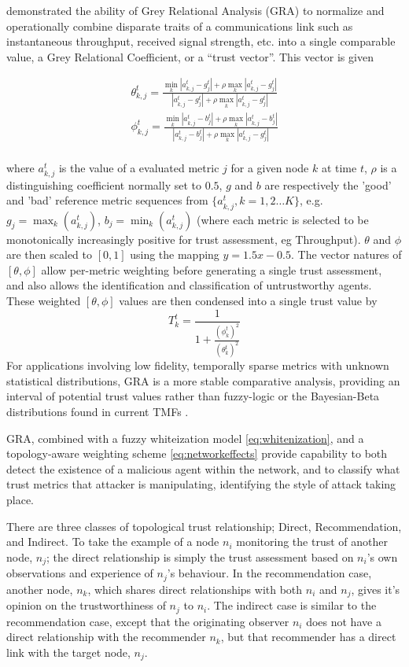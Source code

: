 \documentclass[runningheads,a4paper]{llncs}
\begin{document}
\cite{Guo2012} demonstrated the ability of Grey Relational Analysis (GRA) to normalize and operationally combine disparate traits of a communications link such as instantaneous throughput, received signal strength, etc. into a single comparable value, a Grey Relational Coefficient, or a ``trust vector''.
This vector is given

\begin{align}
  \label{eq:grc}
  \theta_{k,j}^t = \frac{\min_k|a_{k,j}^t - g_j^t| + \rho \max_k|a_{k,j}^t-g_j^t|}{|a_{k,j}^t-g_j^t| + \rho \max_k|a_{k,j}^t-g_j^t|} \\
  \phi_{k,j}^t = \frac{\min_k|a_{k,j}^t - b_j^t| + \rho \max_k|a_{k,j}^t-b_j^t|}{|a_{k,j}^t-b_j^t| + \rho \max_k|a_{k,j}^t-g_j^t|}\\
\end{align}

where $a_{k,j}^t$ is the value of a evaluated metric $j$ for a given node $k$ at time $t$, $\rho$ is a distinguishing coefficient normally set to $0.5$, $g$ and $b$ are respectively the 'good' and 'bad' reference metric sequences from $\{a_{k,j}^t, k=1,2\dots K\}$, e.g. $g_j=\max_k({a_{k,j}^t})$,  $b_j=\min_k({a_{k,j}^t})$ (where each metric is selected to be monotonically increasingly positive for trust assessment, eg Throughput). $\theta$ and $\phi$ are then scaled to $[0,1]$ using the mapping $y = 1.5 x - 0.5$.
The vector natures of $[\theta,\phi]$ allow per-metric weighting before generating a single trust assessment, and also allows the identification and classification of untrustworthy agents.
These weighted $[\theta,\phi]$ values are then condensed into a single trust value by
\begin{equation}
  \label{eq:trustvalue}
  T_k^t = \frac{1}{1+\frac{(\phi_k^t)^2}{(\theta_k^t)^2}}
\end{equation}
For applications involving low fidelity, temporally sparse metrics with unknown statistical distributions, GRA is a more stable comparative analysis, providing an interval of potential trust values rather than fuzzy-logic or the Bayesian-Beta distributions found in current TMFs \cite{Liu2006}. 

GRA, combined with a fuzzy whiteization model \eqref{eq:whitenization}, and a topology-aware weighting scheme \eqref{eq:networkeffects} provide capability to both detect the existence of a malicious agent within the network, and to classify what trust metrics that attacker is manipulating, identifying the style of attack taking place.

There are three classes of topological trust relationship; Direct, Recommendation, and Indirect.
To take the example of a node $n_i$ monitoring the trust of another node, $n_j$; the direct relationship is simply the trust assessment based on $n_i$'s own observations and experience of $n_j$'s behaviour.
In the recommendation case, another node, $n_k$, which shares direct relationships with both $n_i$ and $n_j$, gives it's opinion on the trustworthiness of $n_j$ to $n_i$.
The indirect case is similar to the recommendation case, except that the originating observer $n_i$ does not have a direct relationship with the recommender $n_k$, but that recommender has a direct link with the target node, $n_j$.
\end{document}
